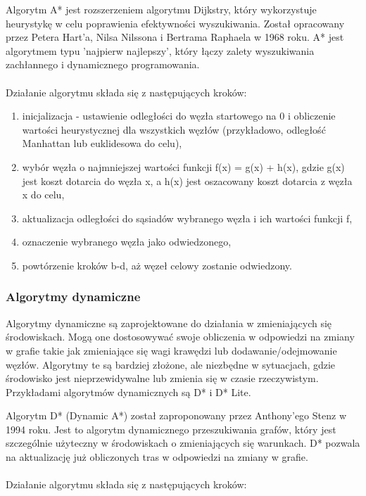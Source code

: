 \documentclass[12pt,twoside]{article}
\begin{document}
Algorytm A* \cite{ASTAR} jest rozszerzeniem algorytmu Dijkstry, który wykorzystuje heurystykę w celu poprawienia efektywności wyszukiwania. Został opracowany przez Petera Hart'a, Nilsa Nilssona i Bertrama Raphaela w 1968 roku. A* jest algorytmem typu 'najpierw najlepszy', który łączy zalety wyszukiwania zachłannego i dynamicznego programowania.
\\ \\
Działanie algorytmu składa się z następujących kroków:

\begin{enumerate}[label=\alph*), leftmargin=1.25cm]
	\item inicjalizacja - ustawienie odległości do węzła startowego na 0 i obliczenie wartości heurystycznej dla wszystkich węzłów (przykładowo, odległość Manhattan lub euklidesowa do celu),
	\item wybór węzła o najmniejszej wartości funkcji f(x) = g(x) + h(x), gdzie g(x) jest koszt dotarcia do węzła x, a h(x) jest oszacowany koszt dotarcia z węzła x do celu,
	\item aktualizacja odległości do sąsiadów wybranego węzła i ich wartości funkcji f,
	\item oznaczenie wybranego węzła jako odwiedzonego,
	\item powtórzenie kroków b-d, aż węzeł celowy zostanie odwiedzony.
\end{enumerate}

\subsubsection{Algorytmy dynamiczne}

Algorytmy dynamiczne są zaprojektowane do działania w zmieniających się środowiskach. Mogą one dostosowywać swoje obliczenia w odpowiedzi na zmiany w grafie takie jak zmieniające się wagi krawędzi lub dodawanie/odejmowanie węzłów. Algorytmy te są bardziej złożone, ale niezbędne w sytuacjach, gdzie środowisko jest nieprzewidywalne lub zmienia się w czasie rzeczywistym. Przykładami algorytmów dynamicznych są D* i D* Lite.

Algorytm D* (Dynamic A*) \cite{DSTAR} został zaproponowany przez Anthony'ego Stenz w 1994 roku. Jest to algorytm dynamicznego przeszukiwania grafów, który jest szczególnie użyteczny w środowiskach o zmieniających się warunkach. D* pozwala na aktualizację już obliczonych tras w odpowiedzi na zmiany w grafie.
\\ \\
Działanie algorytmu składa się z następujących kroków:
\end{document}
